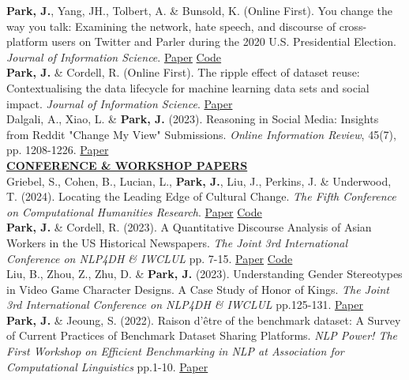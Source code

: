\documentclass{article}
\begin{document}
\noindent \textbf{Park, J.}, Yang, JH., Tolbert, A. \& Bunsold, K. (Online First). You change the way you talk: Examining the network, hate speech, and discourse of cross-platform users on Twitter and Parler during the 2020 U.S. Presidential Election. \textit{Journal of Information Science}. \hfill \href{https://journals.sagepub.com/doi/abs/10.1177/01655515241238405}{Paper} \href{https://github.com/park-jay/cross-platform}{Code} \\ 

\noindent \textbf{Park, J.} \& Cordell, R. (Online First). The ripple effect of dataset reuse: Contextualising the data lifecycle for machine learning data sets and social impact. \textit{Journal of Information Science}. \hfill \href{https://journals.sagepub.com/doi/abs/10.1177/01655515231212977}{Paper} \\

\noindent Dalgali, A., Xiao, L. \& \textbf{Park, J.} (2023). Reasoning in Social Media: Insights from Reddit "Change My View" Submissions. \textit{Online Information Review}, 45(7), pp. 1208-1226. \hfill \href{https://www.emerald.com/insight/content/doi/10.1108/OIR-08-2020-0330/full/html}{Paper} \\

\noindent \textbf{\underline{CONFERENCE \& WORKSHOP PAPERS}} \\ 
Griebel, S., Cohen, B., Lucian, L., \textbf{Park, J.}, Liu, J., Perkins, J. \& Underwood, T. (2024). Locating the Leading Edge of Cultural Change. \textit{The Fifth Conference on Computational Humanities Research}. \hfill \href{https://arxiv.org/pdf/2411.15068}{Paper} \href{https://github.com/IllinoisLiteraryLab/novelty}{Code} \\


\noindent \textbf{Park, J.} \& Cordell, R. (2023). A Quantitative Discourse Analysis of Asian Workers in the US Historical Newspapers. \textit{The Joint 3rd International Conference on NLP4DH \& IWCLUL} pp. 7-15. \hfill \href{https://aclanthology.org/2023.nlp4dh-1.2/}{Paper} \href{https://github.com/park-jay/coolie}{Code}\\

\noindent Liu, B., Zhou, Z., Zhu, D. \& \textbf{Park, J.} (2023). Understanding Gender Stereotypes in Video Game Character Designs. A Case Study of Honor of Kings. \textit{The Joint 3rd International Conference on NLP4DH \& IWCLUL} pp.125-131. \hfill \href{https://arxiv.org/pdf/2311.14226}{Paper} \\

\noindent \textbf{Park, J.} \& Jeoung, S. (2022). Raison d'être of the benchmark dataset: A Survey of Current Practices of Benchmark Dataset Sharing Platforms. \textit{NLP Power! The First Workshop on Efficient Benchmarking in NLP at Association for Computational Linguistics} pp.1-10. \hfill \href{https://aclanthology.org/2022.nlppower-1.1/}{Paper} \\
\end{document}
